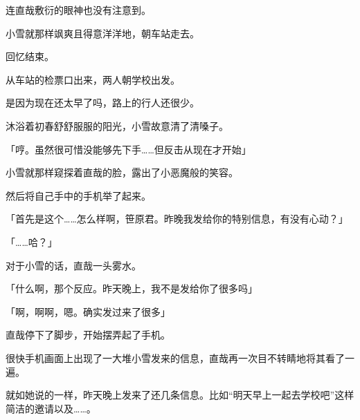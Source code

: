 连直哉敷衍的眼神也没有注意到。

小雪就那样飒爽且得意洋洋地，朝车站走去。

% 


回忆结束。

从车站的检票口出来，两人朝学校出发。

是因为现在还太早了吗，路上的行人还很少。

沐浴着初春舒舒服服的阳光，小雪故意清了清嗓子。

「哼。虽然很可惜没能够先下手……但反击从现在才开始」

小雪就那样窥探着直哉的脸，露出了小恶魔般的笑容。

然后将自己手中的手机举了起来。

「首先是这个……怎么样啊，笹原君。昨晚我发给你的特别信息，有没有心动？」

「……哈？」

对于小雪的话，直哉一头雾水。

「什么啊，那个反应。昨天晚上，我不是发给你了很多吗」

「啊，啊啊，嗯。确实发过来了很多」

直哉停下了脚步，开始摆弄起了手机。

很快手机画面上出现了一大堆小雪发来的信息，直哉再一次目不转睛地将其看了一遍。

就如她说的一样，昨天晚上发来了还几条信息。比如“明天早上一起去学校吧”这样简洁的邀请以及……。


